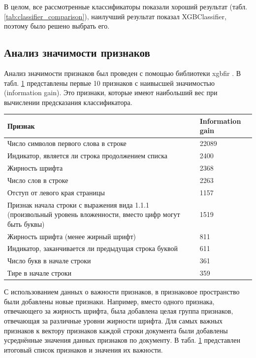 \documentclass{ProcISPRAS}
\begin{document}
В целом, все рассмотренные классификаторы показали хороший результат (табл. \ref{tab:classifier_comparison}), наилучший результат показал XGBClassifier, поэтому было решено выбрать его.

\subsection{Анализ значимости признаков}

Анализ значимости признаков был проведен с помощью библиотеки xgbfir \cite{xgbfir} . В табл. \ref{tab:features_importances} представлены первые 10 признаков с наивысшей значимостью (information gain). Это признаки, которые имеют наибольший вес при вычислении предсказания классификатора.

\begin{table}[ht]
    \begin{tabular}{p{}p{}}
    \toprule
    \textbf{Признак} & \textbf{Information gain} \\
    \midrule
        Число символов первого слова в строке & 22089 \\
        Индикатор, является ли строка продолжением списка & 2400 \\
        Жирность шрифта & 2368 \\
        Число слов в строке & 2263 \\
        Отступ от левого края страницы & 1157 \\
        Признак начала строки с выражения вида 1.1.1 (произвольный уровень вложенности, вместо цифр могут быть буквы) & 1519 \\
        Жирность шрифта (менее жирный шрифт) & 811 \\
        Индикатор, заканчивается ли предыдущая строка буквой & 611 \\
        Число букв в начале строки & 361 \\
        Тире в начале строки & 359 \\
    \bottomrule
    \end{tabular}
    \label{tab:features_importances}
\end{table}

С использованием данных о важности признаков, в признаковое пространство были добавлены новые признаки. Например, вместо одного признака, отвечающего за жирность шрифта, была добавлена целая группа признаков, отвечающая за различные уровни жирности шрифта. Для самых важных признаков к вектору признаков каждой строки документа были добавлены усреднённые значения данных признаков по документу. В табл. \ref{tab:features_importances} представлен итоговый список признаков и значения их важности.
\end{document}
